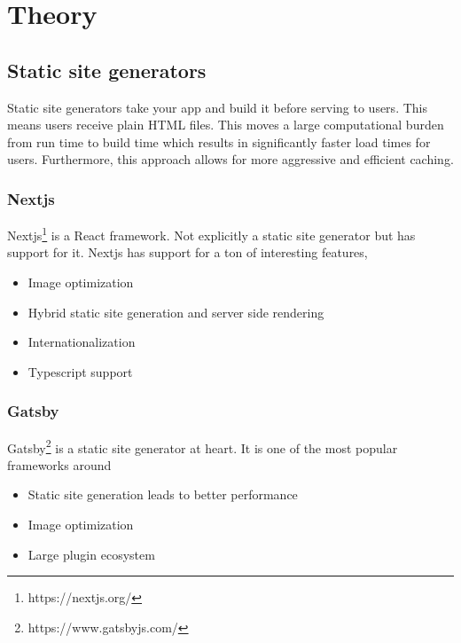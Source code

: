 
\chapter{Theory} %

\label{Chapter3} 


\section{Static site generators}

Static site generators take your app and build it before serving to users. 
This means users receive plain HTML files. This moves a large computational burden from run time to build time which results in significantly faster load times for users.
Furthermore, this approach allows for more aggressive and efficient caching.

\subsection{Nextjs}

Nextjs\footnote{https://nextjs.org/} is a React framework. Not explicitly a static site generator but has support for it. Nextjs has support for a ton of interesting features, 

\begin{itemize}
	\item Image optimization
	\item Hybrid static site generation and server side rendering
	\item Internationalization
	\item Typescript support
\end{itemize}

\subsection{Gatsby}

Gatsby\footnote{https://www.gatsbyjs.com/} is a static site generator at heart. It is one of the most popular frameworks around \cite{jamstackorg-generators}

\begin{itemize}
	\item Static site generation leads to better performance
	\item Image optimization
	\item Large plugin ecosystem
\end{itemize}



